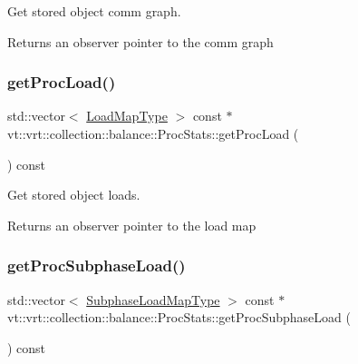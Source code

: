 Get stored object comm graph. 

\begin{DoxyReturn}{Returns}
an observer pointer to the comm graph 
\end{DoxyReturn}
\mbox{\label{structvt_1_1vrt_1_1collection_1_1balance_1_1_proc_stats_a78e64d5f146db787d4bd0557b97c1d49}} 
\subsubsection{\texorpdfstring{get\+Proc\+Load()}{getProcLoad()}}
{\footnotesize\ttfamily std\+::vector$<$ \hyperlink{namespacevt_1_1vrt_1_1collection_1_1balance_a45306ee4bf38fe3fb586d1ee2fa3d147}{Load\+Map\+Type} $>$ const  $\ast$ vt\+::vrt\+::collection\+::balance\+::\+Proc\+Stats\+::get\+Proc\+Load (\begin{DoxyParamCaption}{ }\end{DoxyParamCaption}) const}



Get stored object loads. 

\begin{DoxyReturn}{Returns}
an observer pointer to the load map 
\end{DoxyReturn}
\mbox{\label{structvt_1_1vrt_1_1collection_1_1balance_1_1_proc_stats_a936e989f0d9ad9976374966738c82573}} 
\subsubsection{\texorpdfstring{get\+Proc\+Subphase\+Load()}{getProcSubphaseLoad()}}
{\footnotesize\ttfamily std\+::vector$<$ \hyperlink{namespacevt_1_1vrt_1_1collection_1_1balance_a3d91523158c1025b7b665240072f3b7e}{Subphase\+Load\+Map\+Type} $>$ const  $\ast$ vt\+::vrt\+::collection\+::balance\+::\+Proc\+Stats\+::get\+Proc\+Subphase\+Load (\begin{DoxyParamCaption}{ }\end{DoxyParamCaption}) const}



